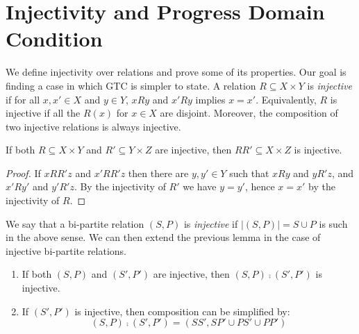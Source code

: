 \section{Injectivity and Progress Domain Condition}
\label{sec:progressDomainCond}

We define injectivity over relations and prove some of its properties. Our goal is finding a case in which GTC is simpler to state. A relation $R \subseteq X \times Y$ is {\em injective} if for all $x,x' \in X$ and $y \in Y$, $xRy$ and $x'Ry$ implies $x = x'$. Equivalently, $R$ is injective if all the $R(x)$ for $x \in X$ are disjoint. Moreover, the composition of two injective relations is always injective.

\begin{lemma}\label{lem:comInjective}
If both $R \subseteq X \times Y$ and $R' \subseteq Y \times Z$ are injective, then $RR' \subseteq X \times Z$ is injective.
\end{lemma}

\begin{proof}
If $xRR'z$ and $x'RR'z$ then there are $y,y' \in Y$ such that $xRy$ and $yR'z$, and $x'Ry'$ and $y'R'z$. By the injectivity of $R'$ we have $y = y'$,
hence $x = x'$ by the injectivity of $R$.
\end{proof}

We say that a bi-partite relation $(S, P)$ is {\em injective} if $|(S, P)| = S \cup P$ is such in the above sense. We can then extend the previous lemma in the case of injective bi-partite relations.

\begin{lemma}\label{lem:biRelInjectiveComp}
\begin{enumerate}
\item
If both $(S,P)$ and $(S',P')$ are injective, then $(S,P) \comp (S',P')$ is injective.

\item
If $(S',P')$ is injective, then composition can be simplified by:
\[ (S,P) \comp (S',P') = (SS', SP' \cup PS' \cup PP') \]
\end{enumerate}
\end{lemma}

